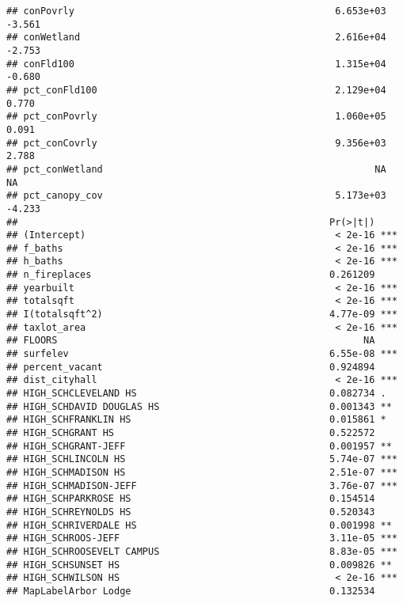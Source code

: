 \documentclass[]{article}
\begin{document}
\begin{verbatim}
## conPovrly                                              6.653e+03  -3.561
## conWetland                                             2.616e+04  -2.753
## conFld100                                              1.315e+04  -0.680
## pct_conFld100                                          2.129e+04   0.770
## pct_conPovrly                                          1.060e+05   0.091
## pct_conCovrly                                          9.356e+03   2.788
## pct_conWetland                                                NA      NA
## pct_canopy_cov                                         5.173e+03  -4.233
##                                                       Pr(>|t|)    
## (Intercept)                                            < 2e-16 ***
## f_baths                                                < 2e-16 ***
## h_baths                                                < 2e-16 ***
## n_fireplaces                                          0.261209    
## yearbuilt                                              < 2e-16 ***
## totalsqft                                              < 2e-16 ***
## I(totalsqft^2)                                        4.77e-09 ***
## taxlot_area                                            < 2e-16 ***
## FLOORS                                                      NA    
## surfelev                                              6.55e-08 ***
## percent_vacant                                        0.924894    
## dist_cityhall                                          < 2e-16 ***
## HIGH_SCHCLEVELAND HS                                  0.082734 .  
## HIGH_SCHDAVID DOUGLAS HS                              0.001343 ** 
## HIGH_SCHFRANKLIN HS                                   0.015861 *  
## HIGH_SCHGRANT HS                                      0.522572    
## HIGH_SCHGRANT-JEFF                                    0.001957 ** 
## HIGH_SCHLINCOLN HS                                    5.74e-07 ***
## HIGH_SCHMADISON HS                                    2.51e-07 ***
## HIGH_SCHMADISON-JEFF                                  3.76e-07 ***
## HIGH_SCHPARKROSE HS                                   0.154514    
## HIGH_SCHREYNOLDS HS                                   0.520343    
## HIGH_SCHRIVERDALE HS                                  0.001998 ** 
## HIGH_SCHROOS-JEFF                                     3.11e-05 ***
## HIGH_SCHROOSEVELT CAMPUS                              8.83e-05 ***
## HIGH_SCHSUNSET HS                                     0.009826 ** 
## HIGH_SCHWILSON HS                                      < 2e-16 ***
## MapLabelArbor Lodge                                   0.132534    

\end{verbatim}
\end{document}
